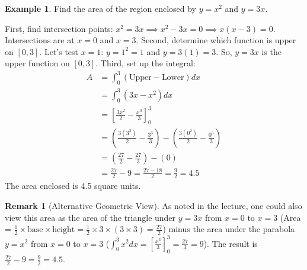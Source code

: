 \documentclass[11pt]{article}
\theoremstyle{definition}
\newtheorem{example}[theorem]{Example}
\newtheorem{remark}[theorem]{Remark}
\theoremstyle{remark} %
\begin{document}
\begin{example}
Find the area of the region enclosed by $y = x^2$ and $y = 3x$.

First, find intersection points: $x^2 = 3x \implies x^2 - 3x = 0 \implies x(x-3) = 0$. Intersections are at $x=0$ and $x=3$.
Second, determine which function is upper on $[0, 3]$. Let's test $x=1$: $y=1^2=1$ and $y=3(1)=3$. So, $y=3x$ is the upper function on $[0, 3]$.
Third, set up the integral:
\begin{align*} A &= \int_0^3 (\text{Upper} - \text{Lower}) dx \\ &= \int_0^3 (3x - x^2) dx \\ &= \left[ \frac{3x^2}{2} - \frac{x^3}{3} \right]_0^3 \\ &= \left( \frac{3(3^2)}{2} - \frac{3^3}{3} \right) - \left( \frac{3(0^2)}{2} - \frac{0^3}{3} \right) \\ &= \left( \frac{27}{2} - \frac{27}{3} \right) - (0) \\ &= \frac{27}{2} - 9 = \frac{27 - 18}{2} = \frac{9}{2} = 4.5 \end{align*}
The area enclosed is 4.5 square units.

\begin{remark}[Alternative Geometric View]
As noted in the lecture, one could also view this area as the area of the triangle under $y=3x$ from $x=0$ to $x=3$ (Area = $\frac{1}{2} \times \text{base} \times \text{height} = \frac{1}{2} \times 3 \times (3\times 3) = \frac{27}{2}$) minus the area under the parabola $y=x^2$ from $x=0$ to $x=3$ ($\int_0^3 x^2 dx = [\frac{x^3}{3}]_0^3 = \frac{27}{3} = 9$). The result is $\frac{27}{2} - 9 = \frac{9}{2} = 4.5$.
\end{remark}
\end{example}
\end{document}
